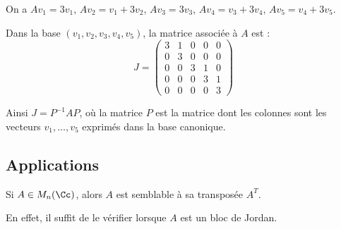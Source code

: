\documentclass[12pt, class=report,crop=false]{standalone}
\begin{document}
\begin{exemple}
\begin{enumerate}
\begin{itemize}
  \end{itemize}
  On a $Av_1 = 3v_1$, $Av_2 = v_1+3v_2$, 
  $Av_3 = 3v_3$, $Av_4 = v_3+3v_4$, $Av_5 = v_4+3v_5$.
   
  Dans la base $(v_1,v_2,v_3,v_4,v_5)$, la matrice associée à $A$ est :
  $$J = \begin{pmatrix}
  3 & 1 & 0 & 0 & 0 \\
0 & 3 & 0 & 0 & 0 \\
0 & 0 & 3 & 1 & 0 \\
0 & 0 & 0 & 3 & 1 \\
0 & 0 & 0 & 0 & 3
  \end{pmatrix}$$
  
Ainsi $J = P^{-1}AP$, où la matrice $P$ est la matrice dont les colonnes sont les vecteurs 
$v_1, \ldots, v_5$ exprimés dans la base canonique.


\end{enumerate}
\end{exemple}

\subsection{Applications}

\begin{exemple}
Si $A \in M_n(\Cc)$, alors $A$ est semblable à sa transposée $A^T$.

En effet, il suffit de le vérifier lorsque $A$ est un bloc de Jordan.
\end{exemple}
\end{document}
